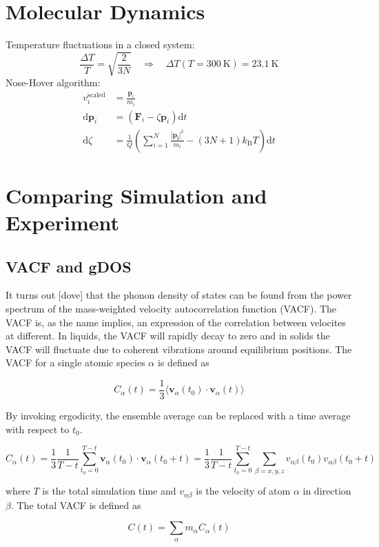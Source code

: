 \section{Molecular Dynamics}
Temperature fluctuations in a closed system:
%
\[ \frac{\Delta T}{T} = \sqrt{\frac{2}{3N}} \quad \Rightarrow \quad \Delta T(T=\SI{300}{\kelvin}) = \SI{23.1}{\kelvin} \]
%
Nose-Hover algorithm:
%
\begin{align*}
v_i^\text{scaled} &= \frac{\bm{p}_i}{m_i} \\
\text{d}\bm{p}_i &= (\bm{F}_i - \zeta \bm{p}_i) \text{d}t \\
\text{d}\zeta &= \frac{1}{Q} \left( \sum_{i=1}^N \frac{|\bm{p_i}|^2}{m_i} - (3N+1)k_\text{B}T\right) \text{d}t
\end{align*}

\section{Comparing Simulation and Experiment}

\subsection{VACF and gDOS}
It turns out [dove] that the phonon density of states can be found from the power spectrum of the mass-weighted velocity autocorrelation function (VACF). The VACF is, as the name implies, an expression of the correlation between velocites at different. In liquids, the VACF will rapidly decay to zero and in solids the VACF will fluctuate due to coherent vibrations around equilibrium positions. The VACF for a single atomic species $\alpha$ is defined as

\[ C_\alpha(t) = \frac{1}{3} \langle \bm{v}_\alpha(t_0) \cdot \bm{v}_\alpha(t) \rangle \]

\noindent By invoking ergodicity, the ensemble average can be replaced with a time average with respect to $t_0$.

\[ C_\alpha(t) = \frac{1}{3} \frac{1}{T-t} \sum_{t_0=0}^{T-t} \bm{v}_\alpha(t_0) \cdot \bm{v}_\alpha(t_0 + t) = \frac{1}{3} \frac{1}{T-t} \sum_{t_0=0}^{T-t} \sum_{\beta=x,y,z} v_{\alpha\beta}(t_0) v_{\alpha\beta}(t_0 + t) \]

\noindent where $T$ is the total simulation time and $v_{\alpha\beta}$ is the velocity of atom $\alpha$ in direction $\beta$. The total VACF is defined as

\[ C(t) = \sum_\alpha m_\alpha C_\alpha(t) \]

